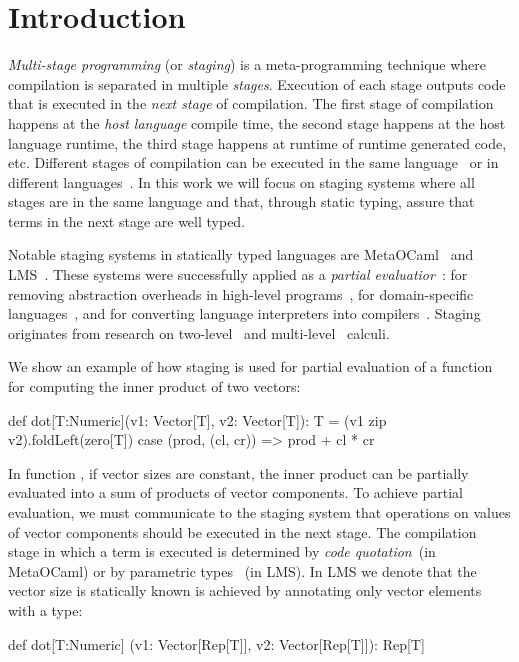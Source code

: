 \section{Introduction}
\label{sct:introduction}

 \emph{Multi-stage programming} (or \emph{staging}) is a meta-programming technique
  where compilation is separated in multiple \emph{stages}. Execution of each
  stage outputs code that is executed in the \emph{next stage} of compilation. The first
  stage of compilation happens at the \emph{host language} compile time, the second
  stage happens at the host language runtime, the third stage happens at runtime of
  runtime generated code, etc. Different stages of compilation can be executed in the same
  language~\cite{taha_multi-stage_1997,nielson2005two} or in different languages~\cite{brown_heterogeneous_2011,devito2013terra}.
  In this work we will focus on staging systems where all stages are in the same language and that, through static typing, assure
  that terms in the next stage are well typed.

  Notable staging systems in statically typed languages are
  MetaOCaml~\cite{taha_multi-stage_1997,calcagno2003implementing}
  and LMS~\cite{rompf2012lightweight}. These systems were successfully applied as a
  \emph{partial evaluatior}~\cite{jones1993partial}: for removing abstraction
  overheads in high-level programs~\cite{carette2005multi,rompf2012lightweight},
  for domain-specific languages~\cite{czarnecki_dsl_2004,jonnalagedda2014staged,taha2004gentle}, and for converting language
  interpreters into compilers~\cite{lancet,futamura1999partial}. Staging originates
  from research on two-level~\cite{nielson2005two,davies1996temporal} and multi-level~\cite{davies1996modal} calculi.

 We show an example of how staging is used for partial evaluation of a function
 for computing the inner product of two vectors\footnotemark[1]:\begin{lstparagraph}
def dot[T:Numeric](v1: Vector[T], v2: Vector[T]): T =
  (v1 zip v2).foldLeft(zero[T]) {
    case (prod, (cl, cr)) => prod + cl * cr
  }
 \end{lstparagraph}

In function , if vector sizes are constant, the inner product can
 be partially evaluated into a sum of products of vector components. To achieve partial evaluation,
 we must communicate to the staging system that operations on values of vector components
 should be executed in the next stage. The compilation stage
 in which a term is executed is determined by \emph{code quotation}~(in MetaOCaml)
 or by parametric types ~(in LMS). In LMS we denote that the vector size
 is statically known is achieved by annotating only vector elements with
 a  type\footnotemark[2]:\begin{lstparagraph}
def dot[T:Numeric]
  (v1: Vector[Rep[T]], v2: Vector[Rep[T]]): Rep[T]
 \end{lstparagraph}

